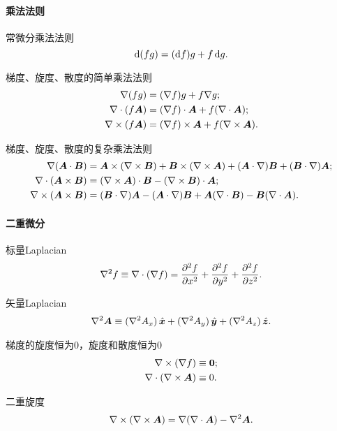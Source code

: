 \paragraph{乘法法则}
\begin{compactitem}
	\item 常微分乘法法则
    \[
        \d(fg)=(\d f)g+f\d g.
    \]
    \item 梯度、旋度、散度的简单乘法法则
    \begin{align}
        \nabla(fg)&=(\nabla f)g+f\nabla g;\\
        \div(f\bm A)&=(\nabla f)\cdot\bm A+f(\div\bm A);\\
        \curl(f\bm A)&=(\nabla f)\times\bm A+f(\curl\bm A).
    \end{align}
    \item 梯度、旋度、散度的复杂乘法法则
    \begin{align}
        \label{eqn:gradA.B}
        \nabla(\bm A\cdot\bm B)&=\bm A\times(\curl\bm B)+\bm B\times(\curl\bm A)+(\bm A\cdot\nabla)\bm B+(\bm B\cdot\nabla)\bm A;\\
        \label{eqn:divAxB}
        \div(\bm A\times\bm B)&=(\curl\bm A)\cdot\bm B-(\curl\bm B)\cdot\bm A;\\
        \label{eqn:curlAxB}
        \curl(\bm A\times\bm B)&=(\bm B\cdot\nabla)\bm A-(\bm A\cdot\nabla)\bm B+\bm A(\div\bm B)-\bm B(\div\bm A).
    \end{align}
\end{compactitem}
\paragraph{二重微分}
\begin{compactitem}
	\item 标量Laplacian
    \begin{align}
        \lap f\equiv\div(\nabla f)=\pv[2]fx+\pv[2]fy+\pv[2]fz.
    \end{align}
	\item 矢量Laplacian
	\begin{align}
        \lap\bm A\equiv(\nabla^2A_x)\uvec x+(\nabla^2A_y)\uvec y+(\nabla^2A_z)\uvec z.
    \end{align}
    \item 梯度的旋度恒为0，旋度和散度恒为0
    \begin{align}
        \label{eqn:curlgrad}
        \curl(\nabla f)&\equiv \bm 0;\\
        \label{eqn:divcurl}
        \div(\curl\bm A)&\equiv 0.
    \end{align}
    \item 二重旋度
    \begin{align}
        \label{eqn:curlcurl}
        \curl(\curl\bm A)=\nabla(\div\bm A)-\lap\bm A.
    \end{align}
\end{compactitem}

